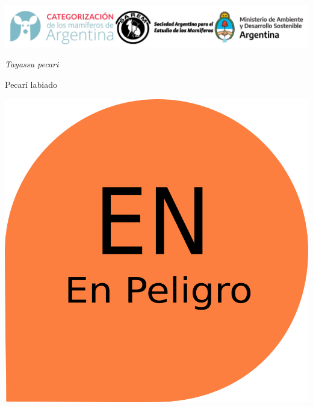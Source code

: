 \documentclass[
  x11names]{article}
\author{}
\date{\vspace{-2.5em}Fecha de creación: 03 April, 2023}
\begin{document}
\setmainfont{Arial}
\setsansfont{Arial}
\setmonofont{Arial}

\newcommand\invisiblesection[1]{%
  \refstepcounter{section}%
  \addcontentsline{toc}{section}{\protect\numberline{\thesection}#1}%
  \sectionmark{#1}}


%
\vspace{-0.4cm}

\includegraphics[width=1\linewidth]{images/Base_info/logo}

\vspace{1cm}

\begin{minipage}{0.7\textwidth}
\vspace{0.3cm}
\fontsize{20}{24}\selectfont\textit{Tayassu pecari}

\vspace{0.3cm}
\fontsize{30}{36}\selectfont Pecarí labiado
\end{minipage}
\hspace{0.05\textwidth}
\begin{minipage}{0.25\textwidth}
\includegraphics[width=\textwidth]{images/en.png}
\end{minipage}
\end{document}
